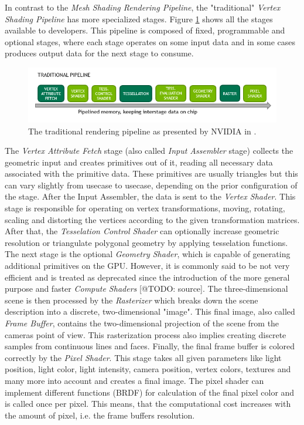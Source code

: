 In contrast to the \emph{Mesh Shading Rendering Pipeline}, the "traditional" \emph{Vertex Shading Pipeline} 
has more specialized stages. Figure \ref{fig:traditional-rendering-pipeline} shows all the stages available 
to developers. This pipeline is composed of fixed, programmable and optional stages, where each 
stage operates on some input data and in some cases produces output data for the next stage to consume.\\

\begin{figure}[h]
    \centering
    \includegraphics[width=\linewidth]{images/graphics/traditional-rendering-pipeline.png}
    \caption{The traditional rendering pipeline as presented by NVIDIA in \cite{Kubisch2018}.}
    \label{fig:traditional-rendering-pipeline}
\end{figure}

\noindent
The \emph{Vertex Attribute Fetch} stage (also called \emph{Input Assembler} stage) collects the geometric 
input and creates primitives out of it, reading all necessary data associated with the primitive data. 
These primitives are usually triangles but this can vary slightly from usecase to usecase, depending
on the prior configuration of the stage. After the Input Assembler, the data is sent to the \emph{Vertex Shader}.
This stage is responsible for operating on vertex transformations, moving, rotating, scaling and distorting the 
vertices according to the given transformation matrices. After that, the \emph{Tesselation Control Shader} can 
optionally increase geometric resolution or triangulate polygonal geometry by applying tesselation functions.
The next stage is the optional \emph{Geometry Shader}, which is capable of generating additional primitives 
on the \ac{GPU}. However, it is commonly said to be not very efficient and is treated as deprecated since the 
introduction of the more general purpose and faster \emph{Compute Shaders} [@TODO: source]. 
The three-dimensional scene is then processed by the \emph{Rasterizer} which breaks down the scene description into 
a discrete, two-dimensional "image". This final image, also called \emph{Frame Buffer}, contains the two-dimensional 
projection of the scene from the cameras point of view. This rasterization process also implies creating discrete 
samples from continuous lines and faces.
Finally, the final frame buffer is colored correctly by the \emph{Pixel Shader}. This stage takes all given parameters 
like light position, light color, light intensity, camera position, vertex colors, textures and many more into account 
and creates a final image. The pixel shader can implement different functions (\ac{BRDF}) for calculation of the final 
pixel color and is called once per pixel. This means, that the computational cost increases with the amount of pixel, 
i.e. the frame buffers resolution. 


